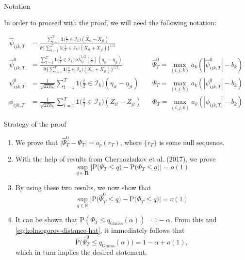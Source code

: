 \documentclass[10pt]{beamer}
\newcommand{\Prob}{\mathrm{P}}
\newcommand{\ind}{\boldsymbol{1}\Big( \frac{t}{T} \in \mathcal{I}_k \Big)} %
\newcommand{\indsmall}{\boldsymbol{1}\big( \frac{t}{T} \in \mathcal{I}_k \big)} %
\begin{document}
\begin{frame}[label = frame_notation]{Notation}
\begin{center}
In order to proceed with the proof, we will need the following notation:
\end{center}
\vspace{-2mm}
\begin{align*}
\hat{\psi}_{ijk, T} &= \frac{\sum\nolimits_{t=1}^T \indsmall (X_{it} -X_{jt})}{\hat{\sigma} \big\{ \sum\nolimits_{t=1}^T \indsmall  (X_{it} + X_{jt} )\big\}^{1/2}} &&\\
\hat{\psi}_{ijk,T}^0 &= \frac{\sum\nolimits_{t=1}^T \indsmall \, \sigma \overline{\lambda}_{ij}^{1/2}(\frac{t}{T}) (\eta_{it} - \eta_{jt})}{ \hat{\sigma} \{ \sum\nolimits_{t=1}^T \indsmall (X_{it} + X_{jt}) \}^{1/2}} &&\hat{\Psi}_T^0 = \max_{(i,j,k)} a_k (|\hat{\psi}_{ijk,T}^0| - b_k)\\
\psi_{ijk,T}^0 &= \frac{1}{\sqrt{2Th_k}} \sum\limits_{t=1}^T \ind (\eta_{it} - \eta_{jt}) &&\Psi_T = \max_{(i,j,k)} a_k (|\psi_{ijk,T}^0| - b_k)\\
\phi_{ijk,T} &= \frac{1}{\sqrt{2 T h_k}} \sum\limits_{t=1}^T \ind (Z_{it} - Z_{jt}) &&\Phi_T = \max_{(i,j,k)} a_k (|\phi_{ijk,T}| - b_k)
\end{align*}
\end{frame}

\begin{frame}{Strategy of the proof}
\begin{enumerate}
\item We prove that  $\big| \hat{\Psi}_T^0 - \Psi_T \big| = o_p(r_T)$, where $\{r_T\}$ is some null sequence.\pause
\item With the help of results from Chernozhukov et al. (2017), we prove
\begin{equation*}\label{eq:kolmogorov-distance}
\sup_{q \in \mathbf{R}} \Big| \Prob\big( \Psi_T \le q \big) - \Prob\big( \Phi_T \le q \big) \Big| = o(1)
\end{equation*}\pause
\vspace{-2mm}
\item By using these two results, we now show that 
\begin{equation}\label{eq:kolmogorov-distance-hat}
\sup_{q \in \mathbb{R}} \Big| \Prob\big( \hat{\Psi}_T^0 \le q \big) - \Prob\big( \Phi_T \le q \big) \Big| = o(1)
\end{equation}\pause
\vspace{-2mm}
\item It can be shown that $\Prob (\Phi_T \le q_{\text{Gauss}}(\alpha)) = 1-\alpha$. From this and \eqref{eq:kolmogorov-distance-hat}, it immediately follows that  
\begin{equation*}
\Prob\big( \hat{\Psi}_T^0 \le q_{\text{Gauss}}(\alpha) \big) = 1 - \alpha + o(1), 
\end{equation*}
which in turn implies the desired statement. 
\end{enumerate}
\end{frame}
\end{document}
